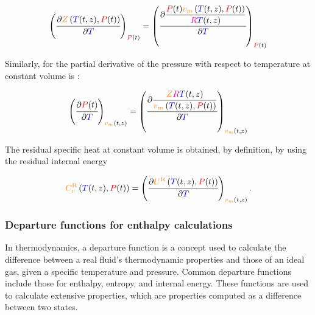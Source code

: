 \documentclass[../Article_Model_Parameters.tex]{subfiles}
\begin{document}
	{\footnotesize
	\begin{equation}
		\left(\cfrac{\partial{\color{orange}Z}\left({\color{blue}T}(t,z), {\color{red}P}(t)\right)}{\partial {\color{blue}T}}\right)_{{\color{red}P}(t)} = \left(\cfrac{\partial \dfrac{{\color{red}P}(t) {\color{orange}v_m}\left({\color{blue}T}(t,z), {\color{red}P}(t)\right)}{{\color{magenta}R}{\color{blue}T}(t,z)}}{\partial {\color{blue}T}}\right)_{{\color{red}P}(t)} \label{eq: dZdT}
	\end{equation} }

	Similarly, for the partial derivative of the pressure with respect to temperature at constant volume is :
	
	{\footnotesize
	\begin{equation}
		\left(\cfrac{\partial {\color{red}P}(t)}{\partial {\color{blue}T}}\right)_{{\color{orange}v_m}(t,z)} = \left( \cfrac{\partial{\dfrac{{\color{orange}Z}{\color{magenta}R}{\color{blue}T}(t,z)}{{\color{orange}v_m}\left({\color{blue}T}(t,z), {\color{red}P}(t)\right)}}}{\partial{\color{blue}T}}\right)_{{\color{orange}v_m}(t,z)} \label{eq: dPdT}
	\end{equation} }
	
	The residual specific heat at constant volume is obtained, by definition, by using the residual internal energy
	
	{\footnotesize
	\begin{equation}
		{\color{orange}C_v^{\text{R}}}\left({\color{blue}T}(t,z),{\color{red}P}(t)\right) = \left(\cfrac{\partial{\color{orange}U^{\text{R}}}\left({\color{blue}T}(t,z),{\color{red}P}(t)\right)}{\partial {\color{blue}T}}\right)_{{\color{orange}v_m}(t,z)}. \label{eq: CvR}
	\end{equation} }
	
	
	\subsubsection{Departure functions for enthalpy calculations} \label{CH:Enthalpy}
	
	In thermodynamics, a departure function is a concept used to calculate the difference between a real fluid's thermodynamic properties and those of an ideal gas, given a specific temperature and pressure. Common departure functions include those for enthalpy, entropy, and internal energy. These functions are used to calculate extensive properties, which are properties computed as a difference between two states.
	
\end{document}
